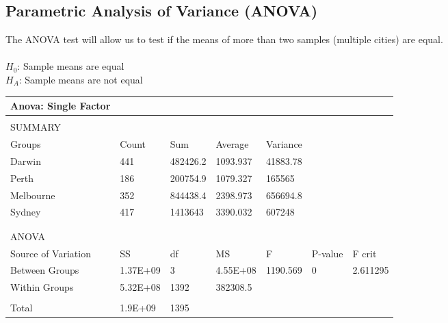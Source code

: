 \documentclass[11pt]{article}
\begin{document}
\subsection{Parametric Analysis of Variance (ANOVA)}
The ANOVA test will allow us to test if the means of more than two samples (multiple cities) are equal.\\ \\
$H_0$: Sample means are equal\\
$H_A$: Sample means are not equal\\
\begin{table}[h]
\begin{tabular}{@{}lllllll@{}}
\toprule
Anova: Single   Factor &          &          &          &          &         &          \\ \midrule
                       &          &          &          &          &         &          \\
SUMMARY                &          &          &          &          &         &          \\
Groups                 & Count    & Sum      & Average  & Variance &         &          \\
Darwin                 & 441      & 482426.2 & 1093.937 & 41883.78 &         &          \\
Perth                  & 186      & 200754.9 & 1079.327 & 165565   &         &          \\
Melbourne              & 352      & 844438.4 & 2398.973 & 656694.8 &         &          \\
Sydney                 & 417      & 1413643  & 3390.032 & 607248   &         &          \\
                       &          &          &          &          &         &          \\
                       &          &          &          &          &         &          \\ \midrule
ANOVA                  &          &          &          &          &         &          \\ \midrule
Source of Variation    & SS       & df       & MS       & F        & P-value & F crit   \\
Between Groups         & 1.37E+09 & 3        & 4.55E+08 & 1190.569 & 0       & 2.611295 \\
Within Groups          & 5.32E+08 & 1392     & 382308.5 &          &         &          \\
                       &          &          &          &          &         &          \\
Total                  & 1.9E+09  & 1395     &          &          &         &          \\ \bottomrule
\end{tabular}
\end{table}
\end{document}
